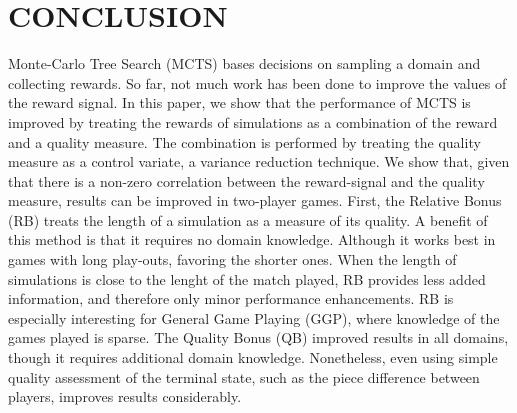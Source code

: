 \documentclass{ecai2014}
\begin{document}
\section{CONCLUSION}
\label{sec:concl}
Monte-Carlo Tree Search (MCTS) bases decisions on sampling a domain and collecting rewards. So far, not much work has been done to improve the values of the reward signal. In this paper, we show that the performance of MCTS is improved by treating the rewards of simulations as a combination of the reward and a quality measure. The combination is performed by treating the quality measure as a control variate, a variance reduction technique. We show that, given that there is a non-zero correlation between the reward-signal and the quality measure, results can be improved in two-player games.
First, the Relative Bonus (RB) treats the length of a simulation as a measure of its quality. A benefit of this method is that it requires no domain knowledge. Although it works best in games with long play-outs, favoring the shorter ones. When the length of simulations is close to the lenght of the match played, RB provides less added information, and therefore only minor performance enhancements. RB is especially interesting for General Game Playing (GGP), where knowledge of the games played is sparse.
The Quality Bonus (QB) improved results in all domains, though it requires additional domain knowledge. Nonetheless, even using simple quality assessment of the terminal state, such as the piece difference between players, improves results considerably.



\end{document}
